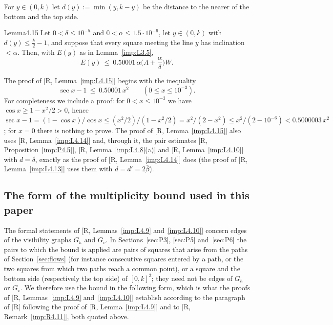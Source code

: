 \documentclass[11pt]{amsart}
\theoremstyle{definition}
\theoremstyle{remark}
\numberwithin{equation}{section}
\begin{document}
For $y\in(0,k)$ let $d(y):=\min(y,k-y)$ be the distance to the nearer of the bottom and the top side.

\begin{ImpStatement}{Lemma}{4.15}\label{imp:L4.15}
Let $0<\delta\le10^{-5}$ and $0<\alpha\le1.5\cdot10^{-6}$, let $y\in(0,k)$ with $d(y)\le\frac k2-1$, and suppose that every square
meeting the line $y$ has inclination $<\alpha$. Then, with $E(y)$ as in Lemma~\ref{imp:L3.5},
\[
E(y)\ \le\ 0.50001\,\alpha\Big(A+\frac\alpha\delta\Big)W .
\]
\end{ImpStatement}

The proof of [R, Lemma~\ref{imp:L4.15}] begins with the inequality
\begin{equation}\label{imp:sec}
\sec x-1\ \le\ 0.50001\,x^2\qquad(0\le x\le10^{-3}).
\end{equation}
For completeness we include a proof: for $0<x\le10^{-3}$ we have $\cos x\ge1-x^2/2>0$, hence
$\sec x-1=(1-\cos x)/\cos x\le(x^2/2)/(1-x^2/2)=x^2/(2-x^2)\le x^2/(2-10^{-6})<0.5000003\,x^2$; for $x=0$ there is
nothing to prove. The proof of [R, Lemma~\ref{imp:L4.15}] also uses [R, Lemma~\ref{imp:L4.14}] and, through it,
the pair estimates [R, Proposition~\ref{imp:P4.5}], [R, Lemma~\ref{imp:L4.8}(a)] and [R, Lemma~\ref{imp:L4.10}]
with $d=\delta$, exactly as the proof of [R, Lemma~\ref{imp:L4.14}] does (the proof of [R, Lemma~\ref{imp:L4.13}]
uses them with $d=d'=2\bar\beta$).

\subsection{The form of the multiplicity bound used in this paper}

The formal statements of [R, Lemmas~\ref{imp:L4.9} and~\ref{imp:L4.10}] concern edges of the visibility graphs
$G_h$ and $G_v$. In Sections~\ref{sec:P3}, \ref{sec:P5} and~\ref{sec:P6} the pairs to which the bound is applied are
pairs of squares that arise from the paths of Section~\ref{sec:flows} (for instance consecutive squares entered by a
path, or the two squares from which two paths reach a common point), or a square and the bottom side (respectively the
top side) of $[0,k]^2$; they need not be edges of $G_h$ or $G_v$. We therefore use the bound in the following form, which is what
the proofs of [R, Lemmas~\ref{imp:L4.9} and~\ref{imp:L4.10}] establish according to the paragraph of [R] following
the proof of [R, Lemma~\ref{imp:L4.9}] and to [R, Remark~\ref{imp:R4.11}], both quoted above.
\end{document}
